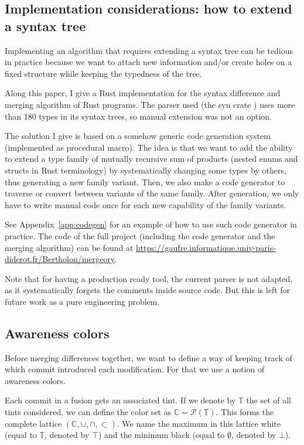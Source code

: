 \documentclass[a4paper,11pt]{article}
\begin{document}
\subsection{Implementation considerations: how to extend a syntax tree}
\label{sec:codegen}
Implementing an algorithm that requires extending a syntax tree can be tedious in practice because we want to attach new information and/or create holes on a fixed structure while keeping the typedness of the tree.

Along this paper, I give a Rust implementation for the syntax difference and merging algorithm of Rust programs. The parser used (the syn crate \cite{syn-crate}) uses more than 180 types in its syntax trees, so manual extension was not an option.

The solution I give is based on a somehow generic code generation system (implemented as procedural macro). The idea is that we want to add the ability to extend a type family of mutually recursive sum of products (nested enums and structs in Rust terminology) by systematically changing some types by others, thus generating a new family variant. Then, we also make a code generator to traverse or convert between variants of the same family. After generation, we only have to write manual code once for each new capability of the family variants.

See Appendix~\ref{app:codegen} for an example of how to use such code generator in practice. The code of the full project (including the code generator and the merging algorithm) can be found at \url{https://gaufre.informatique.univ-paris-diderot.fr/Bertholon/mergeory}.

Note that for having a production ready tool, the current parser is
not adapted, as it systematically forgets the comments inside source
code. But this is left for future work as a pure engineering problem.

\subsection{Awareness colors}
\label{sec:colors}
Before merging differences together, we want to define a way of keeping track of which commit introduced each modification. For that we use a notion of awareness colors.

Each commit in a fusion gets an associated tint. If we denote by
$\mathbb{T}$ the set of all tints considered, we can define the color
set as $\mathbb{C} = \mathcal{P}(\mathbb{T})$. This forms the complete
lattice $(\mathbb{C}, \cup, \cap, \subset)$. We name the maximum in
this lattice white (equal to $\mathbb{T}$, denoted by $\top$) and the
minimum black (equal to $\emptyset$, denoted by $\bot$).
\end{document}
